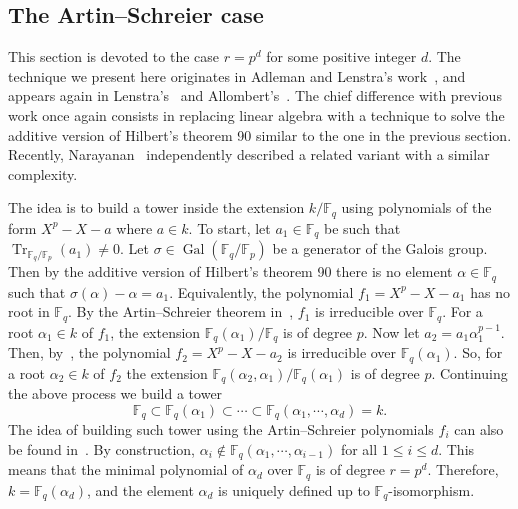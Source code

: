 \documentclass{mcom-l}
\theoremstyle{plain}
\theoremstyle{definition}
\DeclareMathOperator{\trace}{Tr} %
\DeclareMathOperator{\gal}{Gal} %
\newcommand{\F}{\ensuremath{\mathbb{F}}}
\begin{document}
\subsection{The Artin--Schreier case}
\label{sec:fast-artin-schreier}

This section is devoted to the case $r = p^d$ for some positive integer $d$.
The technique we present here originates in Adleman and Lenstra's work~\cite[Lemma 5]{Adleman-Lenstra},
and appears again in Lenstra's~\cite{LenstraJr91}
and Allombert's~\cite{Allombert02}.
The chief difference with previous work once again consists
in replacing linear algebra
with a technique to solve the additive version of Hilbert's theorem 90
similar to the one in the previous section.
Recently, Narayanan~\cite[Sec.~4]{narayanan2016fast} independently described
a related variant with a similar complexity.

The idea is to build a 
tower inside the extension $k/\F_q$ using polynomials of the form $X^p - X - a$ where $a \in k$.
To  start, let $a_1 \in \F_q$ be such that $\trace_{\F_q/\F_p}(a_1) \ne 0$.
Let $\sigma \in  \gal(\F_q/\F_p)$ be a generator of the Galois group.
Then by the additive version of  Hilbert's theorem 90 there is no element 
$\alpha \in \F_q$ such that $\sigma(\alpha) - \alpha = a_1$.
Equivalently, the polynomial $f_1 =  X^p - X - a_1$ has no root in $\F_q$.
By the Artin--Schreier theorem in~\cite[Ch VI]{lang}, $f_1$ 
is irreducible over $\F_q$. For a root $\alpha_1 \in k$ of $f_1$, the extension $\F_q(\alpha_1) / \F_q$ is of degree $p$.
Now let $a_2 = a_1\alpha_1^{p - 1}$. Then, by~\cite[Lemma 5]{Adleman-Lenstra}, the polynomial $f_2 = 
X^p - X - a_2$ is irreducible over $\F_q(\alpha_1)$. So, for a root $\alpha_2 \in k$ of $f_2$ the 
extension $\F_q(\alpha_2, \alpha_1) / \F_q(\alpha_1)$ is of degree $p$. Continuing the above 
process we build a tower
\begin{equation}
	\label{equ:art-sch-tower}
	\F_q \subset \F_q(\alpha_1)  \subset \cdots \subset \F_q(\alpha_1, \cdots, \alpha_d) = k.
\end{equation}
The idea of building such tower using the Artin--Schreier polynomials $f_i$ can also be found
in~\cite{LenstraJr91, Allombert02, shoup93}. By construction, $\alpha_i \notin \F_q(\alpha_1, \cdots, 
\alpha_{i - 1})$ for all $1 \le i \le d$. This means that the minimal polynomial of $\alpha_d$ over 
$\F_q$ is of degree $r = p^d$. Therefore, $k = \F_q(\alpha_d)$, and the element $\alpha_d$ is 
uniquely defined up to $\F_q$-isomorphism.
\end{document}
